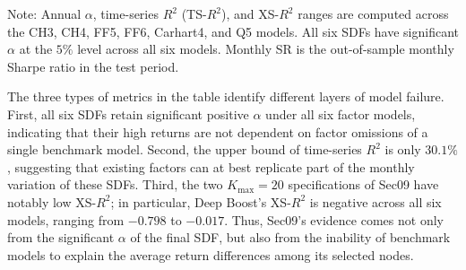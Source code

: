 \documentclass[12pt]{article}
\def\textit#1{#1}%
\begin{document}
\begin{table}[htbp]
\centering
\caption{Top Six Cleaned-Sample SDFs by Out-of-Sample Monthly Sharpe Ratio}
\label{tab:top6_cleaned}
\begin{minipage}{0.96\textwidth}\footnotesize
\textit{Note:} Annual \(\alpha\), time-series \(R^2\) (TS-\(R^2\)), and XS-\(R^2\) ranges are computed across the CH3, CH4, FF5, FF6, Carhart4, and Q5 models. All six SDFs have significant \(\alpha\) at the \(5\%\) level across all six models. Monthly SR is the out-of-sample monthly Sharpe ratio in the test period.
\end{minipage}
\end{table}

The three types of metrics in the table identify different layers of model failure. First, all six SDFs retain significant positive \(\alpha\) under all six factor models, indicating that their high returns are not dependent on factor omissions of a single benchmark model. Second, the upper bound of time-series \(R^2\) is only \(30.1\%\), suggesting that existing factors can at best replicate part of the monthly variation of these SDFs. Third, the two \(K_{\max}=20\) specifications of Sec09 have notably low XS-\(R^2\); in particular, Deep Boost's XS-\(R^2\) is negative across all six models, ranging from \(-0.798\) to \(-0.017\). Thus, Sec09's evidence comes not only from the significant \(\alpha\) of the final SDF, but also from the inability of benchmark models to explain the average return differences among its selected nodes.
\end{document}
